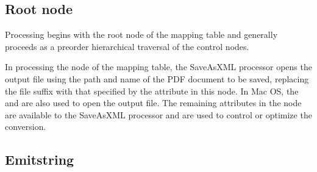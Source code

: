 \documentclass[letterpaper,12pt,english,openany,oneside]{sphinxmanual}
\begin{document}
\subsection{Root node}
\label{\detokenize{index:root-node}}
Processing begins with the root node of the mapping table and generally proceeds as a pre\sphinxhyphen{}order hierarchical traversal of the control nodes.

\begin{sphinxVerbatim}[commandchars=\\\{\}]
      
              
        
\end{sphinxVerbatim}

In processing the  node of the mapping table, the SaveAsXML processor opens the output file using the path and name of the PDF document to be saved, replacing the file suffix with that specified by the  attribute in this node. In Mac OS, the  and  are also used to open the output file. The remaining attributes in the  node are available to the SaveAsXML processor and are used to control or optimize the conversion.


\subsection{Emit\sphinxhyphen{}string}
\label{\detokenize{index:emit-string}}
\begin{sphinxVerbatim}[commandchars=\\\{\}]
  
\end{sphinxVerbatim}
\end{document}
